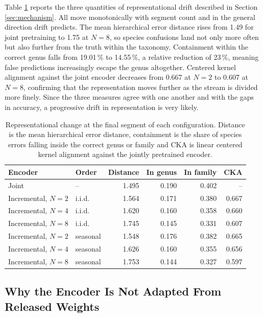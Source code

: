 \documentclass[english]{lni}
\begin{document}
Table \ref{tab:mechanism} reports the three quantities of representational drift described in Section \ref{sec:mechanism}. All move monotonically with segment count and in the general direction drift predicts. The mean hierarchical error distance rises from 1.49 for joint pretraining to 1.75 at $N=8$, so species confusions land not only more often but also further from the truth within the taxonomy. Containment within the correct genus falls from 19.01\,\% to 14.55\,\%, a relative reduction of 23\,\%, meaning false predictions increasingly escape the genus altogether. Centered kernel alignment against the joint encoder decreases from 0.667 at $N=2$ to 0.607 at $N=8$, confirming that the representation moves further as the stream is divided more finely. Since the three measures agree with one another and with the gaps in accuracy, a progressive drift in representation is very likely.

\begin{table}
\centering\footnotesize
\begin{tabular}{llrrrr}
\toprule
Encoder & Order & Distance & In genus & In family & CKA \\
\midrule
Joint              & --       & 1.495 & 0.190 & 0.402 & -- \\
Incremental, $N=2$ & i.i.d.   & 1.564 & 0.171 & 0.380 & 0.667 \\
Incremental, $N=4$ & i.i.d.   & 1.620 & 0.160 & 0.358 & 0.660 \\
Incremental, $N=8$ & i.i.d.   & 1.745 & 0.145 & 0.331 & 0.607 \\
\midrule
Incremental, $N=2$ & seasonal & 1.548 & 0.176 & 0.382 & 0.665 \\
Incremental, $N=4$ & seasonal & 1.626 & 0.160 & 0.355 & 0.656 \\
Incremental, $N=8$ & seasonal & 1.753 & 0.144 & 0.327 & 0.597 \\
\bottomrule
\end{tabular}
\caption{Representational change at the final segment of each configuration. Distance is the mean hierarchical error distance, containment is the share of species errors falling inside the correct genus or family and CKA is linear centered kernel alignment against the jointly pretrained encoder.}
\label{tab:mechanism}
\end{table}

\subsection{Why the Encoder Is Not Adapted From Released Weights}\label{sec:adaptation}
\end{document}
